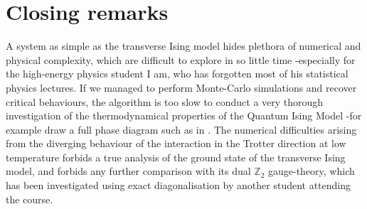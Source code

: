 \documentclass[11pt,openany]{article}
\begin{document}
\section{Closing remarks}

A system as simple as the transverse Ising model hides plethora of numerical and physical complexity, which are difficult to explore in so little time -especially for the high-energy physics student I am, who has forgotten most of his statistical physics lectures. If we managed to perform Monte-Carlo simulations and recover critical behaviours, the algorithm is too slow to conduct a very thorough investigation of the thermodynamical properties of the Quantum Ising Model -for example draw a full phase diagram such as in \cite{Chakrabarti}. The numerical difficulties arising from the diverging behaviour of the interaction in the Trotter direction at low temperature forbids a true analysis of the ground state of the transverse Ising model, and forbids any further comparison with its dual $\mathds{Z}_2$ gauge-theory, which has been investigated using exact diagonalisation by another student attending the course.


\clearpage\printbibliography
\end{document}
